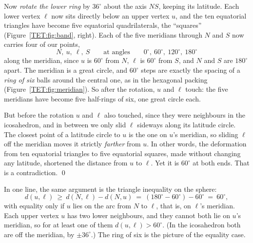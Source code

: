 Now \emph{rotate the lower ring} by $36^\circ$ about the axis $NS$, keeping its latitude. Each lower vertex
$\ell$ now sits directly below an upper vertex $u$, and the ten equatorial triangles have become five
equatorial quadrilaterals, the ``squares'' (Figure~\ref{TET:fig:band}, right). Each of the five
meridians through $N$ and $S$ now carries four of our points,
\[
  N,\ u,\ \ell,\ S\qquad\text{at angles}\qquad 0^\circ,\ 60^\circ,\ 120^\circ,\ 180^\circ
\]
along the meridian, since $u$ is $60^\circ$ from $N$, $\ell$ is $60^\circ$ from $S$, and $N$ and $S$ are
$180^\circ$ apart. The meridian is a great circle, and $60^\circ$ steps are exactly the spacing of a
\emph{ring of six} balls around the central one, as in the hexagonal packing
(Figure~\ref{TET:fig:meridian}). So after the rotation, $u$ and $\ell$ touch: the five meridians have
become five half-rings of six, one great circle each.

But before the rotation $u$ and $\ell$ also touched, since they were neighbours in the icosahedron, and
in between we only slid $\ell$ sideways along its latitude circle. The closest point of a latitude
circle to $u$ is the one on $u$'s meridian, so sliding $\ell$ off the meridian moves it strictly
\emph{farther} from $u$. In other words, the deformation from ten equatorial triangles to five
equatorial squares, made without changing any latitude, shortened the distance from $u$ to $\ell$. Yet
it is $60^\circ$ at both ends. That is a contradiction. \qed

\medskip
In one line, the same argument is the triangle inequality on the sphere:
\[
  d(u,\ell)\ \ge\ d(N,\ell)-d(N,u)\ =\ (180^\circ-60^\circ)-60^\circ\ =\ 60^\circ,
\]
with equality only if $u$ lies on the arc from $N$ to $\ell$, that is, on $\ell$'s meridian. Each upper
vertex $u$ has two lower neighbours, and they cannot both lie on $u$'s meridian, so for at least one of
them $d(u,\ell)>60^\circ$. (In the icosahedron both are off the meridian, by $\pm36^\circ$.) The ring of six
is the picture of the equality case.

